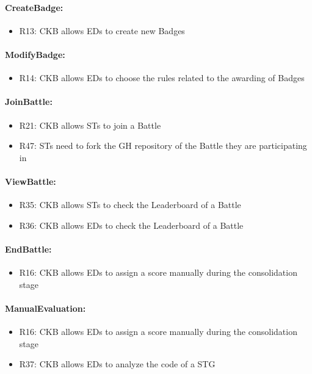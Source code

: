 \paragraph{CreateBadge:}
\begin{itemize}
    \item R13: CKB allows EDs to create new Badges 
\end{itemize}


\paragraph{ModifyBadge:}
\begin{itemize}
    \item R14: CKB allows EDs to choose the rules related to the awarding of Badges 
\end{itemize}


\paragraph{JoinBattle:}
\begin{itemize}
    \item R21: CKB allows STs to join a Battle 
    \item R47: STs need to fork the GH repository of the Battle they are participating in 
\end{itemize}


\paragraph{ViewBattle:}
\begin{itemize}
    \item R35: CKB allows STs to check the Leaderboard of a Battle 
    \item R36: CKB allows EDs to check the Leaderboard of a Battle
\end{itemize}


\paragraph{EndBattle:}
\begin{itemize}
    \item R16: CKB allows EDs to assign a score manually during the consolidation stage 
\end{itemize}


\paragraph{ManualEvaluation:}
\begin{itemize}
    \item R16: CKB allows EDs to assign a score manually during the consolidation stage 
    \item R37: CKB allows EDs to analyze the code of a STG 
\end{itemize}


